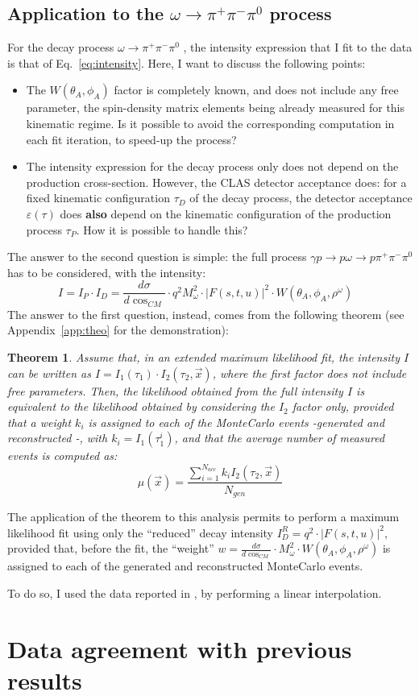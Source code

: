 \documentclass[a4paper,10pt]{report}
\newcommand{\decay}{$\omega \rightarrow \pi^+ \pi^- \pi^0$ }
\newcommand{\fullreaction}{$\gamma p \rightarrow p \omega \rightarrow p \pi^+ \pi^- \pi^{0}$ }
\newtheorem{theorem}{Theorem}
\newcommand{\printteolike}{
Assume that, in an extended maximum likelihood fit, the intensity $I$ can be written as $I=I_1(\tau_1) \cdot I_2(\tau_2,\vec{x})$,
where the first factor does not include free parameters. Then, the likelihood obtained from the full intensity $I$ is equivalent to the
likelihood obtained by considering the $I_2$ factor only, provided that a weight $k_i$ is assigned to each of the MonteCarlo events -generated and reconstructed -, with $k_i=I_1(\tau^i_1)$, and that the average number of measured events is computed as:
\begin{equation}
\mu(\vec{x})=\frac{\sum_{i=1}^{N_{acc}}k_iI_2(\tau_2,\vec{x})}{N_{gen}}
\end{equation}
}
\begin{document}
\section{Application to the \decay process}

For the decay process \decay, the intensity expression that I fit to the data is that of Eq.~\ref{eq:intensity}. Here, I want to discuss the following points:
\begin{itemize}
\item{The $W(\theta_A,\phi_A)$ factor is completely known, and does not include any free parameter, the spin-density matrix elements being already measured for this kinematic regime.
Is it possible to avoid the corresponding computation in each fit iteration, to speed-up the process?}
\item{The intensity expression for the decay process only does not depend on the production cross-section. However, the CLAS detector acceptance does: for a fixed kinematic configuration $\tau_D$ of the decay process,
the detector acceptance $\varepsilon(\tau)$ does \textbf{also} depend on the kinematic configuration of the production process $\tau_P$. How it is possible to handle this?}
\end{itemize}

The answer to the second question is simple: the full process \fullreaction has to be considered, with the intensity:
\begin{equation}\label{eq:fullintensity}
I = I_P \cdot I_D = \frac{d\sigma}{d\cos_{CM}}\cdot q^2M^2_\omega \cdot |F(s,t,u)|^2 \cdot W(\theta_A, \phi_A, \rho^\omega) \; \; \;
\end{equation}
The answer to the first question, instead, comes from the following theorem (see Appendix~\ref{app:theo} for the demonstration):
\begin{theorem}
\printteolike
\end{theorem}

The application of the theorem to this analysis permits to perform a maximum likelihood fit using only the ``reduced'' decay intensity $I^{R}_D=q^2\cdot |F(s,t,u)|^2$, provided that, before the fit, the ``weight'' 
$w= \frac{d\sigma}{d\cos_{CM}}\cdot M^2_\omega \cdot W(\theta_A, \phi_A, \rho^\omega)$ is assigned to each of the generated and reconstructed MonteCarlo events.

To do so, I used the data reported in \cite{Williams:2009ab}, by performing a linear interpolation. 

\chapter{Data agreement with previous results}
\end{document}
